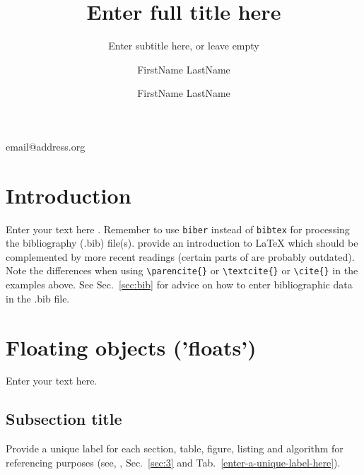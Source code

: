\documentclass[british]{emisa}
\begin{document}
\lstset{language=TeX}
\begin{article}{%

\title[Insert shorttitle for headlines here]{Enter full title here}
\subtitle{Enter subtitle here, or leave empty}
\author*{FirstName LastName}{email@address.org}
\address{Enter affiliation of first and corresponding author here.  Note that only the starred version of author* accepts a second argument providing an email address for the corresponding author.}
\author{FirstName LastName}
\address{Enter affiliation of second author here. Add further authors following the source code scheme.}

}


\section{Introduction}
\label{intro}
Enter your text here \parencite{Mittelbach.2004}. Remember to use \texttt{biber} instead of \texttt{bibtex} for processing the bibliography (.bib) file(s). \textcite{Mittelbach.2004} provide an introduction to \LaTeX{} which should be complemented by more recent readings (\ie certain parts of \cite{Mittelbach.2004} are probably outdated). Note the differences when using \verb|\parencite{}| or \verb|\textcite{}| or \verb|\cite{}| in the examples above. See Sec.~\ref{sec:bib} for advice on how to enter bibliographic data in the .bib file.


\section{Floating objects ('floats')}\label{sec:1}
Enter your text here. 

\subsection{Subsection title}\label{sec:2}
Provide a unique label for each section, table, figure, listing and algorithm for referencing purposes (see, \eg, Sec.~\ref{sec:3} and Tab.~\ref{enter-a-unique-label-here}). 





\end{article}
\end{document}
